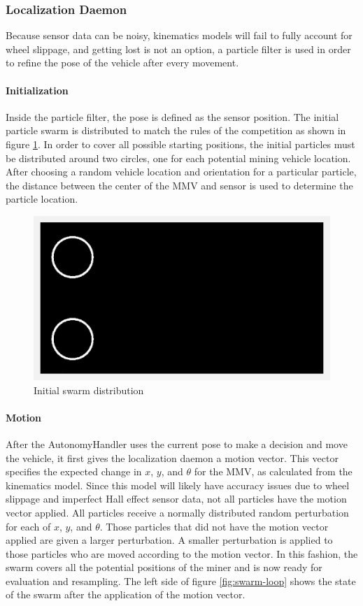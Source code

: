 \subsubsection{Localization Daemon}
Because sensor data can be noisy, kinematics models will fail to fully account for wheel slippage, and getting lost is not an option, a particle filter is used in order to refine the pose of the vehicle after every movement.
\paragraph{Initialization}
Inside the particle filter, the pose is defined as the sensor position.  The initial particle swarm is distributed to match the rules of the competition as shown in figure \ref{fig:swarm-init}.  In order to cover all possible starting positions, the initial particles must be distributed around two circles, one for each potential mining vehicle location.  After choosing a random vehicle location and orientation for a particular particle, the distance between the center of the MMV and sensor is used to determine the particle location.
\begin{figure}[H]
\includegraphics[width=\linewidth]{swarm-init.png}
\caption{Initial swarm distribution}
\label{fig:swarm-init}
\end{figure}
\paragraph{Motion}
After the AutonomyHandler uses the current pose to make a decision and move the vehicle, it first gives the localization daemon a motion vector.  This vector specifies the expected change in $x$, $y$, and $\theta$ for the MMV, as calculated from the kinematics model.  Since this model will likely have accuracy issues due to wheel slippage and imperfect Hall effect sensor data, not all particles have the motion vector applied.  All particles receive a normally distributed random perturbation for each of $x$, $y$, and $\theta$.  Those particles that did not have the motion vector applied are given a larger perturbation.  A smaller perturbation is applied to those particles who are moved according to the motion vector.  In this fashion, the swarm covers all the potential positions of the miner and is now ready for evaluation and resampling.  The left side of figure \ref{fig:swarm-loop} shows the state of the swarm after the application of the motion vector.
